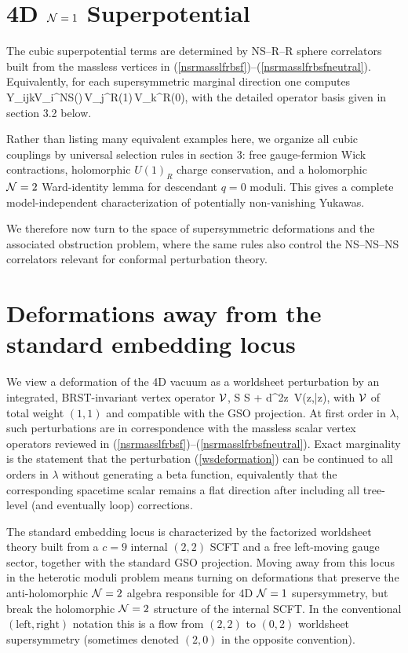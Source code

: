 \documentclass[12pt]{article}
\newcommand{\bz}{\bar{z}}
\begin{document}
\section{4D ${\cal N}=1$ Superpotential}

The cubic superpotential terms are determined by NS--R--R sphere correlators built from the massless vertices in (\ref{nsrmasslfrbsf})--(\ref{nsrmasslfrbsfneutral}). Equivalently, for each supersymmetric marginal direction one computes
\ie
Y_{ijk}\;\propto\;\left\langle V_i^{\rm NS}(\infty)\,V_j^{\rm R}(1)\,V_k^{\rm R}(0)\right\rangle,
\fe
with the detailed operator basis given in section 3.2 below.

Rather than listing many equivalent examples here, we organize all cubic couplings by universal selection rules in section 3: free gauge-fermion Wick contractions, holomorphic $U(1)_R$ charge conservation, and a holomorphic ${\cal N}=2$ Ward-identity lemma for descendant $q=0$ moduli. This gives a complete model-independent characterization of potentially non-vanishing Yukawas.

We therefore now turn to the space of supersymmetric deformations and the associated obstruction problem, where the same rules also control the NS--NS--NS correlators relevant for conformal perturbation theory.

\section{Deformations away from the standard embedding locus}

We view a deformation of the 4D vacuum as a worldsheet perturbation by an integrated, BRST-invariant vertex operator ${\cal V}$,
\ie\label{wsdeformation}
S \;\to\; S + \lambda \int d^2z~{\cal V}(z,\bz),
\fe
with ${\cal V}$ of total weight $(1,1)$ and compatible with the GSO projection. At first order in $\lambda$, such perturbations are in correspondence with the massless scalar vertex operators reviewed in (\ref{nsrmasslfrbsf})--(\ref{nsrmasslfrbsfneutral}). Exact marginality is the statement that the perturbation (\ref{wsdeformation}) can be continued to all orders in $\lambda$ without generating a beta function, equivalently that the corresponding spacetime scalar remains a flat direction after including all tree-level (and eventually loop) corrections.

The standard embedding locus is characterized by the factorized worldsheet theory built from a $c=9$ internal $(2,2)$ SCFT and a free left-moving gauge sector, together with the standard GSO projection. Moving away from this locus in the heterotic moduli problem means turning on deformations that preserve the anti-holomorphic ${\cal N}=2$ algebra responsible for 4D ${\cal N}=1$ supersymmetry, but break the holomorphic ${\cal N}=2$ structure of the internal SCFT. In the conventional $(\text{left},\text{right})$ notation this is a flow from $(2,2)$ to $(0,2)$ worldsheet supersymmetry (sometimes denoted $(2,0)$ in the opposite convention).
\end{document}
